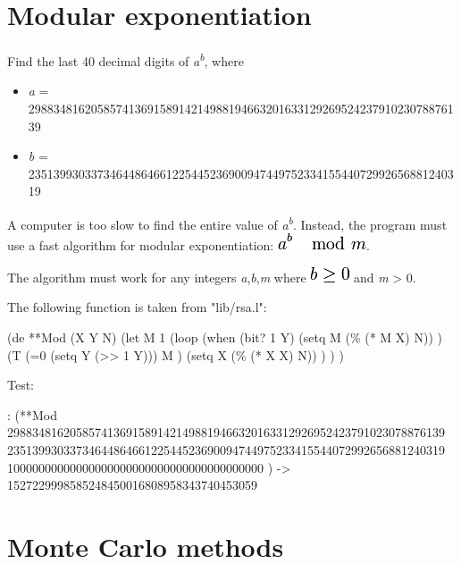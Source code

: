 \pagebreak{}
\section*{Modular exponentiation}

Find the last 40 decimal digits of \emph{a}\textsuperscript{\emph{b}},
where

\begin{itemize}
\item
  \emph{a} =
  2988348162058574136915891421498819466320163312926952423791023078876139
\item
  \emph{b} =
  2351399303373464486466122544523690094744975233415544072992656881240319
\end{itemize}

A computer is too slow to find the entire value of
\emph{a}\textsuperscript{\emph{b}}. Instead, the program must use a fast
algorithm for modular exponentiation:
\includegraphics[scale=.6]{graphics/366abde6144a8e6e0d97ba03fd5cde12.png}.

The algorithm must work for any integers \emph{a},\emph{b},\emph{m}
where
\includegraphics[scale=.6]{graphics/180df89d659ad6dc8f29a74fffe1cfb5.png}
and \emph{m} \textgreater{} 0.



\begin{wideverbatim}

The following function is taken from "lib/rsa.l":

(de **Mod (X Y N)
   (let M 1
      (loop
         (when (bit? 1 Y)
            (setq M (\% (* M X) N)) )
         (T (=0 (setq Y (>> 1 Y)))
            M )
         (setq X (\% (* X X) N)) ) ) )

Test:

: (**Mod
   2988348162058574136915891421498819466320163312926952423791023078876139
   2351399303373464486466122544523690094744975233415544072992656881240319
   10000000000000000000000000000000000000000 )
-> 1527229998585248450016808958343740453059
\end{wideverbatim}

\pagebreak{}
\section*{Monte Carlo methods}

